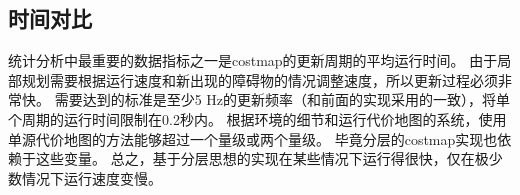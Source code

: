 \subsection{时间对比}
统计分析中最重要的数据指标之一是costmap的更新周期的平均运行时间。 由于局部规划需要根据运行速度和新出现的障碍物的情况调整速度，所以更新过程必须非常快。 需要达到的标准是至少5 Hz的更新频率（和前面的实现采用的一致），将单个周期的运行时间限制在0.2秒内。 根据环境的细节和运行代价地图的系统，使用单源代价地图的方法能够超过一个量级或两个量级。 毕竟分层的costmap实现也依赖于这些变量。 总之，基于分层思想的实现在某些情况下运行得很快，仅在极少数情况下运行速度变慢。


